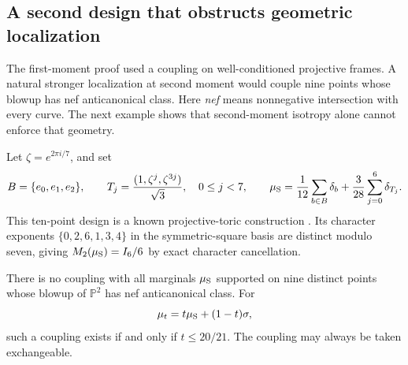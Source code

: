 \subsection{A second design that obstructs geometric localization}
\label{geo:singer}

The first-moment proof used a coupling on well-conditioned projective
frames. A natural stronger localization at second moment would couple
nine points whose blowup has nef anticanonical class. Here \emph{nef}
means nonnegative intersection with every curve. The next example
shows that second-moment isotropy alone cannot enforce that geometry.

Let \(\zeta=e^{2\pi i/7}\), and set
\begin{equation}
 B=\{e_0,e_1,e_2\},\qquad
 T_j=\frac{(1,\zeta^j,\zeta^{3j})}{\sqrt3},\quad 0\le j<7,\qquad
 \mu_{\rm S}=\frac1{12}\sum_{b\in B}\delta_b+
                  \frac3{28}\sum_{j=0}^6\delta_{T_j}.
 \label{geo:singer-measure}
\end{equation}
This ten-point design is a known projective-toric construction
\cite[Example 4.2]{geo_iosue2024}. Its character exponents
\(\{0,2,6,1,3,4\}\) in the symmetric-square basis are distinct modulo
seven, giving \(M_2(\mu_{\rm S})=I_6/6\) by exact character cancellation.

\begin{theorem}
\label{geo:singer-nef}
There is no coupling with all marginals \(\mu_{\rm S}\) supported on
nine distinct points whose blowup of \(\mathbb P^2\) has nef
anticanonical class. For
\[
 \mu_t=t\mu_{\rm S}+(1-t)\sigma,
\]
such a coupling exists if and only if \(t\le20/21\).
The coupling may always be taken exchangeable.
\end{theorem}

